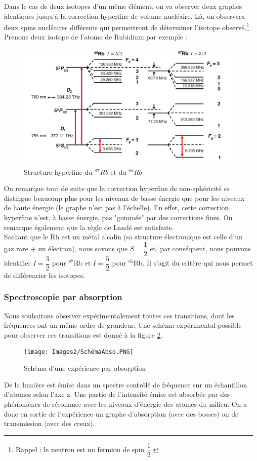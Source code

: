 Dans le cas de deux isotopes d'un même élément, on va observer deux graphes identiques jusqu'à la correction hyperfine de volume nucléaire. Là, on observera deux spins nucléaires différents qui permettront de déterminer l'isotope observé.\footnote{Rappel : le neutron est un fermion de spin $\dfrac{1}{2}$.} Prenons deux isotope de l'atome de Rubidium par exemple :
\begin{figure}[htp]
    \centering
    \includegraphics[scale=0.8]{Images2/ComparaisonRb.PNG}
    \caption{Structure hyperfine du $^{87}Rb$ et du $^{85}Rb$}
\label{eq:struct_hyperfine}
\end{figure}
On remarque tout de suite que la correction hyperfine de non-sphéricité se distingue beaucoup plus pour les niveaux de basse énergie que pour les niveaux de haute énergie (le graphe n'est pas à l'échelle). En effet, cette correction hyperfine n'est, à basse énergie, pas "gommée" par des corrections fines. On remarque également que la règle de Landé est satisfaite.\\
Sachant que le Rb est un métal alcalin (sa structure électronique est celle d'un gaz rare + un électron), nous savons que $S = \dfrac{1}{2}$ et, par conséquent, nous pouvons identifier $I = \dfrac{3}{2}$ pour $^{87}$Rb et $I = \dfrac{5}{2}$ pour $^{85}$Rb. Il s'agit du critère qui nous permet de différencier les isotopes.



\subsubsection{Spectroscopie par absorption}


Nous souhaitons observer expérimentalement toutes ces transitions, dont les fréquences ont un même ordre de grandeur. Une schéma expérimental possible pour observer ces transitions est donné à la figure \ref{fig:SchemaAbso}.
\begin{figure}[htp]
    \centering
    \texttt{[image: Images2/SchémaAbso.PNG]}
    \caption{Schéma d'une expérience par absorption}
    \label{fig:SchemaAbso}
\end{figure}
De la lumière est émise dans un spectre contrôlé de fréquence sur un échantillon d'atomes selon l'axe z. Une partie de l'intensité émise est absorbée par des phénomènes de résonance avec les niveaux d'énergie des atomes du milieu. On a donc en sortie de l'expérience un graphe d'absorption (avec des bosses) on de transmission (avec des creux).\\

